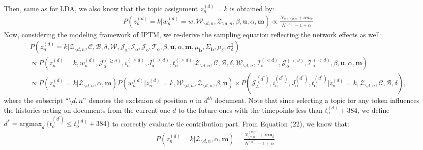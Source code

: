 \documentclass[a4paper]{article}
\begin{document}
     Then, same as for LDA, we also know that the topic assignment $z_n^{(d)}=k$ is obtained by:
     \begin{equation*}
     \begin{aligned}
     &P(z^{(d)}_n=k|w^{(d)}_n=w, \mathcal{W}_{\backslash d, n}, \mathcal{Z}_{\backslash d,n}, \beta, \boldsymbol{u}, \alpha, \boldsymbol{m}) \propto
     \frac{N_{k|d, \backslash d, n}+\alpha m_k}{N^{(d)}-1+\alpha}
     \end{aligned}
     \end{equation*}
     Now, considering the modeling framework of IPTM, we re-derive the sampling equation reflecting the network effects as well:
   \begin{equation}
   \begin{aligned} & 
   P(z^{(d)}_n=k|\mathcal{Z}_{\backslash d, n},   \mathcal{C},   \mathcal{B}, \delta, \mathcal{W},  \mathcal{J}_{\mbox{a}}, \mathcal{I}_{\mbox{o}}, \mathcal{J}_{\mbox{o}}, \mathcal{T}_{\mbox{o}}, \beta, \boldsymbol{u}, \alpha, \boldsymbol{m},  \mu_{\boldsymbol{b}}, \Sigma_{\boldsymbol{b}}, \mu_\delta, \sigma^2_\delta)\\
   & \propto P(z^{(d)}_n=k, w^{(d)}_n, \mathcal{J}^{(\geq d)}_{\mbox{a}}, i^{(\geq d)}_{\mbox{o}}, J^{(\geq d)}_{\mbox{o}}, t^{(\geq d)}_{\mbox{o}}|\mathcal{Z}_{\backslash d, n}, \mathcal{C},   \mathcal{B},\delta,\mathcal{W}_{\backslash d, n}, \mathcal{I}^{(<d)}_{\mbox{o}}, \mathcal{J}^{(<d)}_{\mbox{o}}, \mathcal{T}^{(<d)}_{\mbox{o}}, \beta, \boldsymbol{u}, \alpha, \boldsymbol{m})\\
   &\propto P(z^{(d)}_n=k|\mathcal{Z}_{\backslash d, n}, \alpha, \boldsymbol{m})P(w^{(d)}_n|z^{(d)}_n=k, \mathcal{W}_{\backslash d, n}, \mathcal{Z}_{\backslash d, n}, \beta, \boldsymbol{u} )\times P(\mathcal{J}^{(d ^*)}_{\mbox{a}}, i^{(d^*)}_{\mbox{o}}, J^{(d^*)}_{\mbox{o}}, t^{(d^*)}_{\mbox{o}}| z^{(d)}_n=k, \mathcal{Z}_{\backslash d, n}, \mathcal{C}, \mathcal{B}, \delta),
   \end{aligned}
   \end{equation}
   where the subscript $``{\backslash d, n}"$ denotes the exclsuion of position $n$ in $d^{th}$ document. Note that since selecting a topic for any token influences the histories acting on documents from the current one $d$ to the future ones with the timepoints less than $t_o^{(d)}+384$, we define $d^*=\mbox{argmax}_{d^\prime} \{t_o^{(d^\prime)} \leq t_o^{(d)}+384\}$ to correctly evaluate tie contribution part. From Equation (22), we know that:
   \begin{equation}
   \begin{aligned} 
   P(z^{(d)}_n=k|\mathcal{Z}_{\backslash d, n}, \alpha, \boldsymbol{m})=\frac{N^{(k|d)}_{\backslash d, n}+\alpha \boldsymbol{m}_k}{N^{(d)}-1+\alpha}
   \end{aligned}
   \end{equation}
\end{document}
